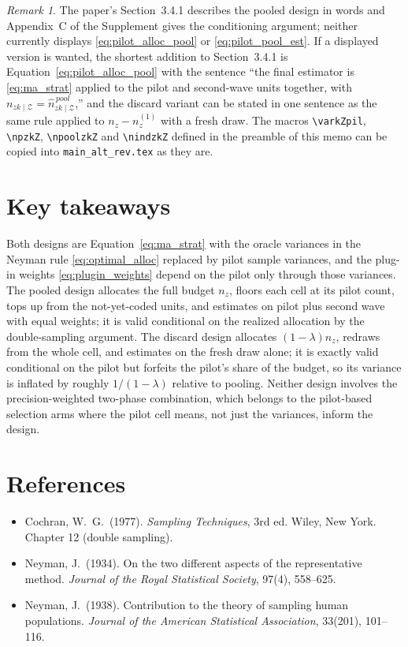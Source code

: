 \documentclass[12pt]{article}
\theoremstyle{remark}
\newtheorem*{remark}{Remark}
\newcommand{\nzkZ}{n_{zk \mid\mathcal{Z}}}
\newcommand{\npoolzkZ}{\hat{n}^{\,pool}_{zk \mid \mathcal{Z}}}
\newcommand{\code}[1]{\texttt{#1}}
\begin{document}
\begin{remark}
The paper's Section~3.4.1 describes the pooled design in words and Appendix~C of the Supplement gives the conditioning argument; neither currently displays \eqref{eq:pilot_alloc_pool} or \eqref{eq:pilot_pool_est}. If a displayed version is wanted, the shortest addition to Section~3.4.1 is Equation~\eqref{eq:pilot_alloc_pool} with the sentence ``the final estimator is \eqref{eq:ma_strat} applied to the pilot and second-wave units together, with $\nzkZ = \npoolzkZ$,'' and the discard variant can be stated in one sentence as the same rule applied to $n_z - n^{(1)}_z$ with a fresh draw. The macros \code{\textbackslash varkZpil}, \code{\textbackslash npzkZ}, \code{\textbackslash npoolzkZ} and \code{\textbackslash nindzkZ} defined in the preamble of this memo can be copied into \code{main\_alt\_rev.tex} as they are.
\end{remark}

\section*{Key takeaways}

Both designs are Equation~\eqref{eq:ma_strat} with the oracle variances in the Neyman rule \eqref{eq:optimal_alloc} replaced by pilot sample variances, and the plug-in weights \eqref{eq:plugin_weights} depend on the pilot only through those variances. The pooled design allocates the full budget $n_z$, floors each cell at its pilot count, tops up from the not-yet-coded units, and estimates on pilot plus second wave with equal weights; it is valid conditional on the realized allocation by the double-sampling argument. The discard design allocates $(1-\lambda) n_z$, redraws from the whole cell, and estimates on the fresh draw alone; it is exactly valid conditional on the pilot but forfeits the pilot's share of the budget, so its variance is inflated by roughly $1/(1-\lambda)$ relative to pooling. Neither design involves the precision-weighted two-phase combination, which belongs to the pilot-based selection arms where the pilot cell means, not just the variances, inform the design.

\section*{References}

\begin{itemize}[leftmargin=*, itemsep=2pt]
\item Cochran, W.\ G.\ (1977). \emph{Sampling Techniques}, 3rd ed. Wiley, New York. Chapter 12 (double sampling).
\item Neyman, J.\ (1934). On the two different aspects of the representative method. \emph{Journal of the Royal Statistical Society}, 97(4), 558--625.
\item Neyman, J.\ (1938). Contribution to the theory of sampling human populations. \emph{Journal of the American Statistical Association}, 33(201), 101--116.
\end{itemize}
\end{document}
